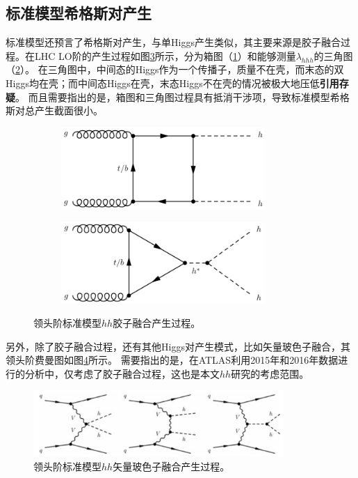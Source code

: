 \subsection{标准模型希格斯对产生}
标准模型还预言了希格斯对产生，与单Higgs产生类似，其主要来源是胶子融合过程。在LHC LO阶的产生过程如图\ref{fig:diagram_SMhh_ggF}所示，分为箱图（\ref{fig:diagram_SMhh_box}）和能够测量$\lambda_{hhh}$的三角图（\ref{fig:diagram_SMhh_triangle}）。
在三角图中，中间态的Higgs作为一个传播子，质量不在壳，而末态的双Higgs均在壳；而中间态Higgs在壳，末态Higgs不在壳的情况被极大地压低\cite{Patrignani:2016xqp}\textbf{引用存疑}。
而且需要指出的是，箱图和三角图过程具有抵消干涉项，导致标准模型希格斯对总产生截面很小。
\begin{figure}[h]
\centering
 \begin{subfigure}[b]{0.45\textwidth}
  \includegraphics[width=0.85\textwidth]{fig/SMhh_box.png}
  \caption{}
  \label{fig:diagram_SMhh_box}
 \end{subfigure}
 \begin{subfigure}[b]{0.45\textwidth}
  \includegraphics[width=0.85\textwidth]{fig/SMhh_triangle.png}
  \caption{}
  \label{fig:diagram_SMhh_triangle}
 \end{subfigure}
\caption{领头阶标准模型$hh$胶子融合产生过程。}
\label{fig:diagram_SMhh_ggF}
\end{figure}

另外，除了胶子融合过程，还有其他Higgs对产生模式，比如矢量玻色子融合，其领头阶费曼图如图\ref{fig:diagram_SMhh_VBF}所示。
需要指出的是，在ATLAS利用2015年和2016年数据进行的分析中，仅考虑了胶子融合过程，这也是本文$hh$研究的考虑范围。
\begin{figure}[h]
\centering
  \includegraphics[width=0.85\textwidth]{fig/SMhh_VBF.png}
\caption{领头阶标准模型$hh$矢量玻色子融合产生过程。}
\label{fig:diagram_SMhh_VBF}
\end{figure}


